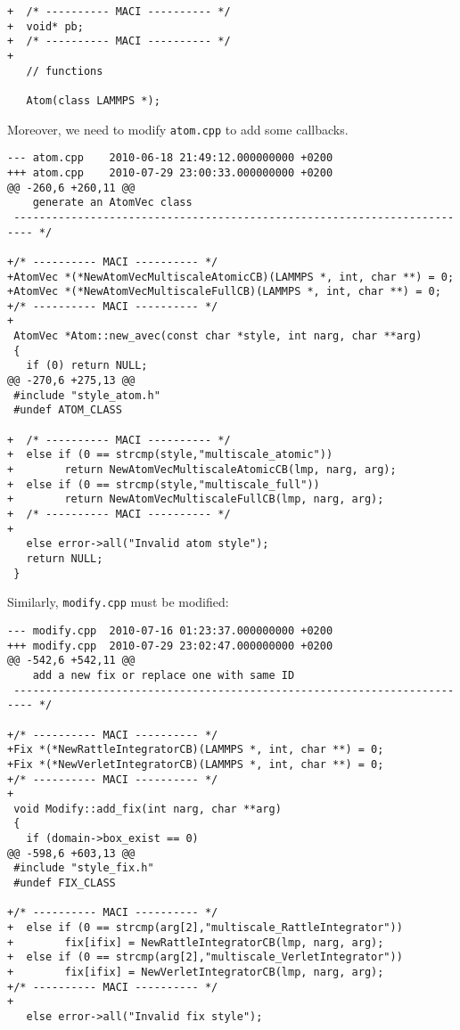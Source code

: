 \begin{enumerate}
\begin{lstlisting}[style=CODE_SMALL,frame=lines]
+  /* ---------- MACI ---------- */
+  void* pb;
+  /* ---------- MACI ---------- */
+
   // functions
 
   Atom(class LAMMPS *);
\end{lstlisting}

Moreover, we need to modify \lstinline[style=SHELL]|atom.cpp| to add some callbacks.

\vspace{1pt}
\begin{lstlisting}[style=CODE_SMALL,frame=lines]
--- atom.cpp	2010-06-18 21:49:12.000000000 +0200
+++ atom.cpp	2010-07-29 23:00:33.000000000 +0200
@@ -260,6 +260,11 @@
    generate an AtomVec class
 ------------------------------------------------------------------------- */
 
+/* ---------- MACI ---------- */
+AtomVec *(*NewAtomVecMultiscaleAtomicCB)(LAMMPS *, int, char **) = 0;
+AtomVec *(*NewAtomVecMultiscaleFullCB)(LAMMPS *, int, char **) = 0;
+/* ---------- MACI ---------- */
+
 AtomVec *Atom::new_avec(const char *style, int narg, char **arg)
 {
   if (0) return NULL;
@@ -270,6 +275,13 @@
 #include "style_atom.h"
 #undef ATOM_CLASS
 
+  /* ---------- MACI ---------- */
+  else if (0 == strcmp(style,"multiscale_atomic")) 
+        return NewAtomVecMultiscaleAtomicCB(lmp, narg, arg);
+  else if (0 == strcmp(style,"multiscale_full")) 
+        return NewAtomVecMultiscaleFullCB(lmp, narg, arg);
+  /* ---------- MACI ---------- */
+
   else error->all("Invalid atom style");
   return NULL;
 }
\end{lstlisting}

Similarly, \lstinline[style=SHELL]|modify.cpp| must be modified:

\vspace{1pt}
\begin{lstlisting}[style=CODE_SMALL,frame=lines]
--- modify.cpp	2010-07-16 01:23:37.000000000 +0200
+++ modify.cpp	2010-07-29 23:02:47.000000000 +0200
@@ -542,6 +542,11 @@
    add a new fix or replace one with same ID
 ------------------------------------------------------------------------- */
 
+/* ---------- MACI ---------- */
+Fix *(*NewRattleIntegratorCB)(LAMMPS *, int, char **) = 0;
+Fix *(*NewVerletIntegratorCB)(LAMMPS *, int, char **) = 0;
+/* ---------- MACI ---------- */
+
 void Modify::add_fix(int narg, char **arg)
 {
   if (domain->box_exist == 0) 
@@ -598,6 +603,13 @@
 #include "style_fix.h"
 #undef FIX_CLASS
 
+/* ---------- MACI ---------- */
+  else if (0 == strcmp(arg[2],"multiscale_RattleIntegrator")) 
+        fix[ifix] = NewRattleIntegratorCB(lmp, narg, arg);
+  else if (0 == strcmp(arg[2],"multiscale_VerletIntegrator")) 
+        fix[ifix] = NewVerletIntegratorCB(lmp, narg, arg);
+/* ---------- MACI ---------- */
+
   else error->all("Invalid fix style");
 

\end{lstlisting}
\end{enumerate}
